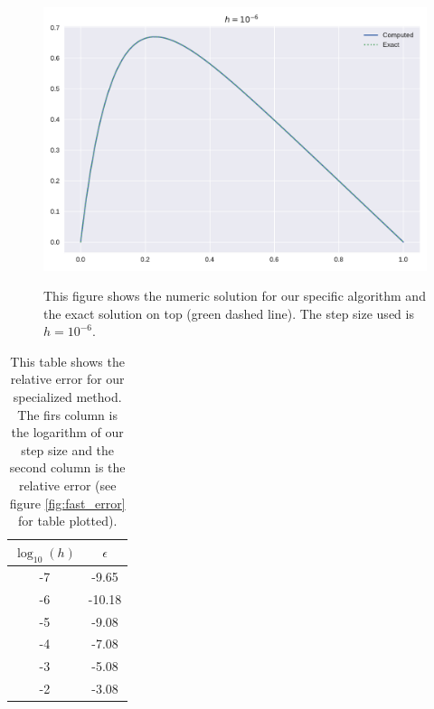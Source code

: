 \documentclass[reprint, english,notitlepage]{revtex4-1}  %
\begin{document}
\begin{figure}[h]
	\centering
	\includegraphics[scale=0.5]{../output/fast_6.pdf}
	\label{fig:fast_6}
	\caption{This figure shows the numeric solution for our specific algorithm and the exact solution on top (green dashed line). The step size used is $h=10^{-6}$.}
\end{figure}

\begin{table} [h]  %
	\begin{tabular}{||c | c||}
			\hline
			$\log_{10}(h)$ & $\epsilon$    \\ \hline
			-7 & -9.65    \\ \hline
			-6 & -10.18    \\ \hline
			-5 & -9.08    \\ \hline
			-4 & -7.08    \\ \hline
			-3 & -5.08    \\ \hline
			-2 & -3.08    \\ \hline
	\end{tabular}
	\caption{This table shows the relative error for our specialized method. The firs column is the logarithm of our step size and the second column is the relative error (see figure \ref{fig:fast_error} for table plotted).}
	\label{tab:fast_error}
\end{table}
\end{document}
